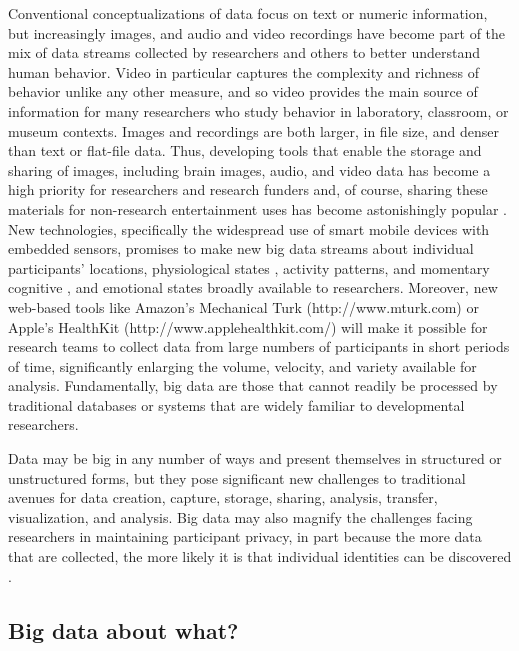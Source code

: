 \documentclass[letterpaper,man,apacite]{apa6}
\begin{document}
Conventional conceptualizations of data focus on text or numeric information, but increasingly images, and audio \cite{Mehl} and video recordings have become part of the mix of data streams collected by researchers and others to better understand human behavior.
Video in particular captures the complexity and richness of behavior unlike any other measure, and so video provides the main source of information for many researchers who study behavior in laboratory, classroom, or museum contexts. 
Images and recordings are both larger, in file size, and denser than text or flat-file data. 
Thus, developing tools that enable the storage and sharing of images, including brain images, audio, and video data has become a high priority for researchers and research funders \cite{Databrary2015, openfmri.org} and, of course, sharing these materials for non-research entertainment uses has become astonishingly popular \cite{YouTube2015}.
New technologies, specifically the widespread use of smart mobile devices with embedded sensors, promises to make new big data streams about individual participants' locations, physiological states \cite{Picard}, activity patterns, and momentary cognitive \cite{Sliwinski}, and emotional states broadly available to researchers.
Moreover, new web-based tools like Amazon's Mechanical Turk (http://www.mturk.com) or Apple's HealthKit (http://www.applehealthkit.com/) will make it possible for research teams to collect data from large numbers of participants in short periods of time, significantly enlarging the volume, velocity, and variety available for analysis.   
Fundamentally, big data are those that cannot readily be processed by traditional databases or systems that are widely familiar to developmental researchers.

Data may be big in any number of ways and present themselves in structured or unstructured forms, but they pose significant new challenges to traditional avenues for data creation, capture, storage, sharing, analysis, transfer, visualization, and analysis.
Big data may also magnify the challenges facing researchers in maintaining participant privacy, in part because the more data that are collected, the more likely it is that individual identities can be discovered \cite{sweeney_identifiability}.

\subsection{Big data about what?}

\end{document}
